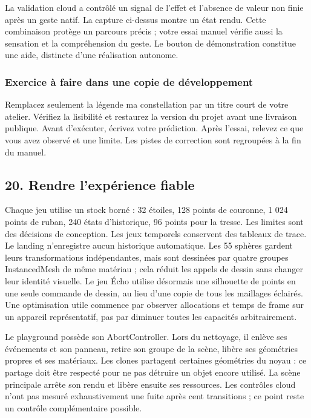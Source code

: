 \documentclass[
  canadien,
  11pt,
  letterpaper,
]{article}
\begin{document}
La validation cloud a contrôlé un signal de l'effet et l'absence de
valeur non finie après un geste natif. La capture ci-dessus montre un
état rendu. Cette combinaison protège un parcours précis ; votre essai
manuel vérifie aussi la sensation et la compréhension du geste. Le
bouton de démonstration constitue une aide, distincte d'une réalisation
autonome.

\subsubsection{Exercice à faire dans une copie de
développement}\label{exercice-uxe0-faire-dans-une-copie-de-duxe9veloppement-14}

Remplacez seulement la légende ma constellation par un titre court de
votre atelier. Vérifiez la lisibilité et restaurez la version du projet
avant une livraison publique. Avant d'exécuter, écrivez votre
prédiction. Après l'essai, relevez ce que vous avez observé et une
limite. Les pistes de correction sont regroupées à la fin du manuel.

\subsection{20. Rendre l'expérience
fiable}\label{rendre-lexpuxe9rience-fiable}

Chaque jeu utilise un stock borné : 32 étoiles, 128 points de couronne,
1 024 points de ruban, 240 états d'historique, 96 points pour la tresse.
Les limites sont des décisions de conception. Les jeux temporels
conservent des tableaux de trace. Le landing n'enregistre aucun
historique automatique. Les 55 sphères gardent leurs transformations
indépendantes, mais sont dessinées par quatre groupes InstancedMesh de
même matériau ; cela réduit les appels de dessin sans changer leur
identité visuelle. Le jeu Écho utilise désormais une silhouette de
points en une seule commande de dessin, au lieu d'une copie de tous les
maillages éclairés. Une optimisation utile commence par observer
allocations et temps de frame sur un appareil représentatif, pas par
diminuer toutes les capacités arbitrairement.

Le playground possède son AbortController. Lors du nettoyage, il enlève
ses événements et son panneau, retire son groupe de la scène, libère ses
géométries propres et ses matériaux. Les clones partagent certaines
géométries du noyau : ce partage doit être respecté pour ne pas détruire
un objet encore utilisé. La scène principale arrête son rendu et libère
ensuite ses ressources. Les contrôles cloud n'ont pas mesuré
exhaustivement une fuite après cent transitions ; ce point reste un
contrôle complémentaire possible.
\end{document}
